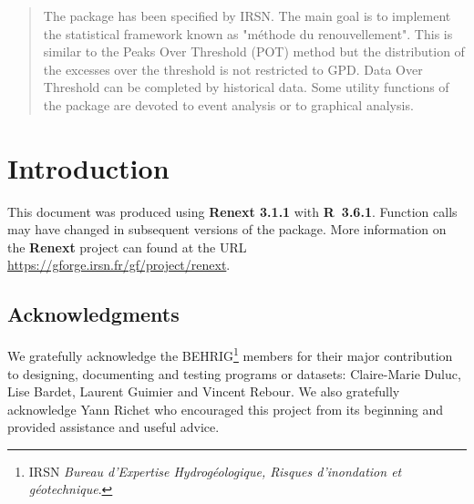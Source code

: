 \documentclass[a4paper]{report}
\newcommand\blankpage{%
    \null
    \thispagestyle{empty}%
    \addtocounter{page}{-1}%
    \newpage}
\newenvironment{Prov}
   {\medskip \par \noindent%
    \sf \color{blue} }%
  {\medskip \par}
\begin{document}
\begin{abstract}
  
  The \verb@Renext@ package has been specified by IRSN.  The main goal
  is to implement the statistical framework known as "m\'ethode du
  renouvellement".  This is similar to the Peaks Over Threshold (POT)
  method but the distribution of the excesses over the threshold is
  not restricted to GPD. Data Over Threshold can be completed by
  historical data.  Some utility functions of the package are devoted
  to event analysis or to graphical analysis.

\end{abstract}

\pagebreak

\setcounter{page}{1}

\chapter{Introduction}
\label{Chap-Intro}

\begin{Prov}
  This document was produced using  \textbf{Renext 3.1.1}
  with \textbf{R~3.6.1}. 
  Function calls may have changed in subsequent versions of the package.
  More information on the \textbf{Renext} project can found at the 
  URL \url{https://gforge.irsn.fr/gf/project/renext}.
\end{Prov}

\section*{Acknowledgments}
 
We gratefully acknowledge the BEHRIG\footnote{IRSN \textit{Bureau
    d'Expertise Hydrog\'eologique, Risques d'inondation et
    g\'eotechnique}.} members for their major contribution to
designing, documenting and testing programs or datasets: Claire-Marie
Duluc, Lise Bardet, Laurent Guimier and Vincent Rebour. We also
gratefully acknowledge Yann Richet who encouraged this project from
its beginning and provided assistance and useful advice.
\end{document}
